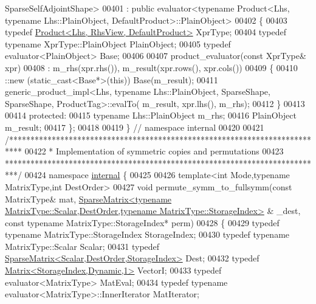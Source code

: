 \begin{DoxyCode}
      SparseSelfAdjointShape>
00401   : \textcolor{keyword}{public} evaluator<typename Product<Lhs, typename Lhs::PlainObject, DefaultProduct>::PlainObject>
00402 \{
00403   \textcolor{keyword}{typedef} \hyperlink{group___core___module_class_eigen_1_1_product}{Product<Lhs, RhsView, DefaultProduct>} XprType;
00404   \textcolor{keyword}{typedef} \textcolor{keyword}{typename} XprType::PlainObject PlainObject;
00405   \textcolor{keyword}{typedef} evaluator<PlainObject> Base;
00406 
00407   product\_evaluator(\textcolor{keyword}{const} XprType& xpr)
00408     : m\_rhs(xpr.rhs()), m\_result(xpr.rows(), xpr.cols())
00409   \{
00410     ::new (static\_cast<Base*>(\textcolor{keyword}{this})) Base(m\_result);
00411     generic\_product\_impl<Lhs, typename Lhs::PlainObject, SparseShape, SparseShape, ProductTag>::evalTo(
      m\_result, xpr.lhs(), m\_rhs);
00412   \}
00413   
00414 \textcolor{keyword}{protected}:
00415   \textcolor{keyword}{typename} Lhs::PlainObject m\_rhs;
00416   PlainObject m\_result;
00417 \};
00418 
00419 \} \textcolor{comment}{// namespace internal}
00420 
00421 \textcolor{comment}{/***************************************************************************}
00422 \textcolor{comment}{* Implementation of symmetric copies and permutations}
00423 \textcolor{comment}{***************************************************************************/}
00424 \textcolor{keyword}{namespace }\hyperlink{namespaceinternal}{internal} \{
00425 
00426 \textcolor{keyword}{template}<\textcolor{keywordtype}{int} Mode,\textcolor{keyword}{typename} MatrixType,\textcolor{keywordtype}{int} DestOrder>
00427 \textcolor{keywordtype}{void} permute\_symm\_to\_fullsymm(\textcolor{keyword}{const} MatrixType& mat, 
      \hyperlink{group___sparse_core___module_class_eigen_1_1_sparse_matrix}{SparseMatrix<typename MatrixType::Scalar,DestOrder,typename MatrixType::StorageIndex>}
      & \_dest, \textcolor{keyword}{const} \textcolor{keyword}{typename} MatrixType::StorageIndex* perm)
00428 \{
00429   \textcolor{keyword}{typedef} \textcolor{keyword}{typename} MatrixType::StorageIndex StorageIndex;
00430   \textcolor{keyword}{typedef} \textcolor{keyword}{typename} MatrixType::Scalar Scalar;
00431   \textcolor{keyword}{typedef} \hyperlink{group___sparse_core___module_class_eigen_1_1_sparse_matrix}{SparseMatrix<Scalar,DestOrder,StorageIndex>} Dest;
00432   \textcolor{keyword}{typedef} \hyperlink{group___core___module}{Matrix<StorageIndex,Dynamic,1>} VectorI;
00433   \textcolor{keyword}{typedef} evaluator<MatrixType> MatEval;
00434   \textcolor{keyword}{typedef} \textcolor{keyword}{typename} evaluator<MatrixType>::InnerIterator MatIterator;

\end{DoxyCode}
